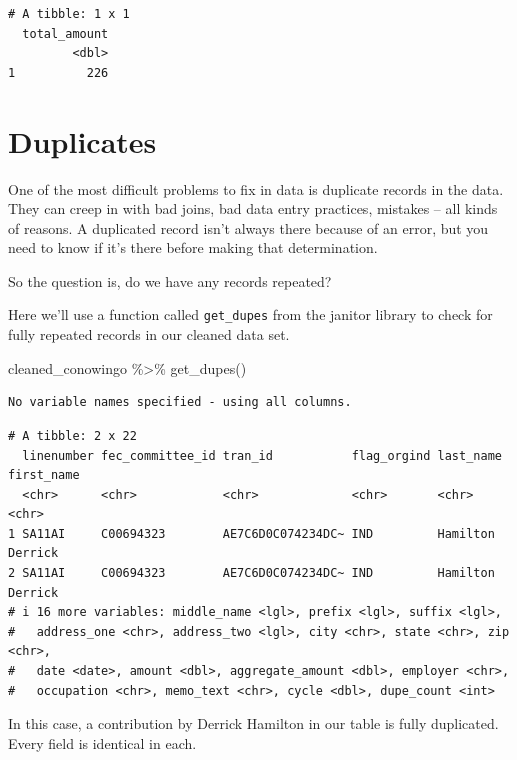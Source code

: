 \documentclass[
  letterpaper,
  DIV=11,
  numbers=noendperiod]{scrreprt}
\newenvironment{Shaded}{\begin{snugshade}}{\end{snugshade}}
\newcommand{\FunctionTok}[1]{\textcolor[rgb]{0.28,0.35,0.67}{#1}}
\newcommand{\NormalTok}[1]{\textcolor[rgb]{0.00,0.23,0.31}{#1}}
\newcommand{\SpecialCharTok}[1]{\textcolor[rgb]{0.37,0.37,0.37}{#1}}
\begin{document}
\begin{verbatim}
# A tibble: 1 x 1
  total_amount
         <dbl>
1          226
\end{verbatim}

\hypertarget{duplicates}{%
\section{Duplicates}\label{duplicates}}

One of the most difficult problems to fix in data is duplicate records
in the data. They can creep in with bad joins, bad data entry practices,
mistakes -- all kinds of reasons. A duplicated record isn't always there
because of an error, but you need to know if it's there before making
that determination.

So the question is, do we have any records repeated?

Here we'll use a function called \texttt{get\_dupes} from the janitor
library to check for fully repeated records in our cleaned data set.

\begin{Shaded}
\begin{Highlighting}[]
\NormalTok{cleaned\_conowingo }\SpecialCharTok{\%\textgreater{}\%}
  \FunctionTok{get\_dupes}\NormalTok{()}
\end{Highlighting}
\end{Shaded}

\begin{verbatim}
No variable names specified - using all columns.
\end{verbatim}

\begin{verbatim}
# A tibble: 2 x 22
  linenumber fec_committee_id tran_id           flag_orgind last_name first_name
  <chr>      <chr>            <chr>             <chr>       <chr>     <chr>     
1 SA11AI     C00694323        AE7C6D0C074234DC~ IND         Hamilton  Derrick   
2 SA11AI     C00694323        AE7C6D0C074234DC~ IND         Hamilton  Derrick   
# i 16 more variables: middle_name <lgl>, prefix <lgl>, suffix <lgl>,
#   address_one <chr>, address_two <lgl>, city <chr>, state <chr>, zip <chr>,
#   date <date>, amount <dbl>, aggregate_amount <dbl>, employer <chr>,
#   occupation <chr>, memo_text <chr>, cycle <dbl>, dupe_count <int>
\end{verbatim}

In this case, a contribution by Derrick Hamilton in our table is fully
duplicated. Every field is identical in each.
\end{document}
